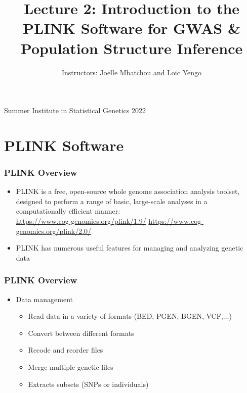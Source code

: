 \documentclass{beamer}
\title{Lecture 2: Introduction to the PLINK Software for GWAS \& Population Structure Inference}
\author{Instructors: Joelle Mbatchou and Loic Yengo}
\date{}
\begin{document}
	
	
	
	\begin{frame}
		\titlepage
		\vspace{-2cm}
		\begin{center}
			
			{ \Large Summer Institute in Statistical Genetics 2022\\}
		

\end{center}
\end{frame}


\section{PLINK Software}
	
\begin{frame}
\frametitle{\bf PLINK Overview}
\begin{itemize}
\item PLINK is a free, open-source whole genome association analysis toolset, designed to perform a range of basic, large-scale analyses in a computationally efficient manner: \\
\vspace{.5em}
{\color{red}
\url{https://www.cog-genomics.org/plink/1.9/}
\url{https://www.cog-genomics.org/plink/2.0/}
}
\vspace{.5em}

\item PLINK has numerous useful features for managing and analyzing genetic data
\end{itemize}
\end{frame}

  \begin{frame}
	\frametitle{\bf PLINK Overview}
	\begin{itemize}
\item Data management
\begin{itemize}
	\item Read data in a variety of formats (BED, PGEN, BGEN, VCF,...)
	\item Convert between different formats
	\item Recode and reorder files
	\item Merge multiple genetic files
	\item Extracts subsets (SNPs or individuals)
\end{itemize}
	\end{itemize}
\end{frame}
\end{document}
